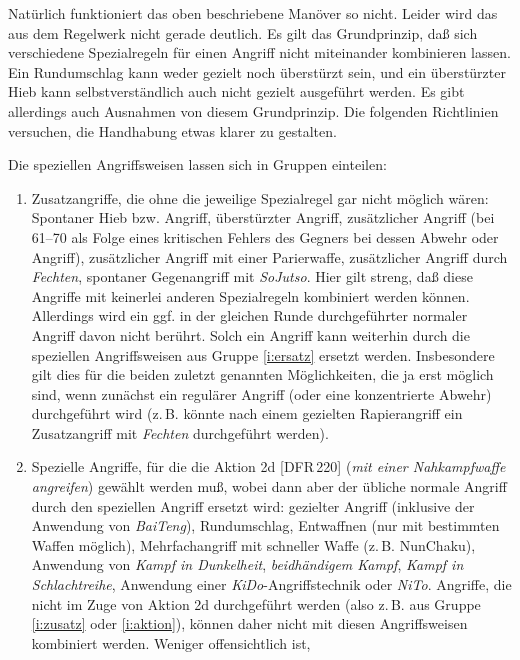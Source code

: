 \documentclass[10pt,a4paper,germanpar]{article}
\begin{document}
Natürlich funktioniert das oben beschriebene Manöver so nicht. Leider
wird das aus dem Regelwerk nicht gerade deutlich. Es gilt das
Grundprinzip, daß sich verschiedene Spezialregeln für einen Angriff
nicht miteinander kombinieren lassen. Ein Rundumschlag kann weder
gezielt noch überstürzt sein, und ein überstürzter Hieb kann
selbstverständlich auch nicht gezielt ausgeführt werden. Es gibt
allerdings auch Ausnahmen von diesem Grundprinzip. Die folgenden
Richtlinien versuchen, die Handhabung etwas klarer zu gestalten.

Die speziellen Angriffsweisen lassen sich in Gruppen einteilen:

\begin{enumerate}
\item \label{i:zusatz} Zusatzangriffe, die ohne die jeweilige
  Spezialregel gar nicht möglich wären: Spontaner Hieb bzw. Angriff,
  überstürzter Angriff, zusätzlicher Angriff (bei 61--70 als Folge
  eines kritischen Fehlers des Gegners bei dessen Abwehr oder
  Angriff), zusätzlicher Angriff mit einer Parierwaffe, zusätzlicher
  Angriff durch \emph{Fechten}, spontaner Gegenangriff mit
  \emph{SoJutso}. Hier gilt streng, daß diese Angriffe mit keinerlei
  anderen Spezialregeln kombiniert werden können. Allerdings wird ein
  ggf. in der gleichen Runde durchgeführter normaler Angriff davon
  nicht berührt. Solch ein Angriff kann weiterhin durch die speziellen
  Angriffsweisen aus Gruppe \ref{i:ersatz} ersetzt
  werden. Insbesondere gilt dies für die beiden zuletzt genannten
  Möglichkeiten, die ja erst möglich sind, wenn zunächst ein regulärer
  Angriff (oder eine konzentrierte Abwehr) durchgeführt wird
  (z.\,B. könnte nach einem gezielten Rapierangriff ein Zusatzangriff
  mit \emph{Fechten} durchgeführt werden).
\item \label{i:ersatz} Spezielle Angriffe, für die die Aktion 2d
  [DFR\,220] (\emph{mit einer Nahkampfwaffe angreifen}) gewählt werden
  muß, wobei dann aber der übliche normale Angriff durch den
  speziellen Angriff ersetzt wird: gezielter Angriff (inklusive der
  Anwendung von \emph{BaiTeng}), Rundumschlag, Entwaffnen (nur mit
  bestimmten Waffen möglich), Mehrfachangriff mit schneller Waffe
  (z.\,B. NunChaku), Anwendung von \emph{Kampf in Dunkelheit},
  \emph{beidhändigem Kampf}, \emph{Kampf in Schlachtreihe}, Anwendung
  einer \emph{KiDo}-Angriffstechnik oder \emph{NiTo}. Angriffe, die
  nicht im Zuge von Aktion 2d durchgeführt werden (also z.\,B. aus
  Gruppe \ref{i:zusatz} oder \ref{i:aktion}), können daher nicht mit
  diesen Angriffsweisen kombiniert werden. Weniger offensichtlich ist,

\end{enumerate}
\end{document}
